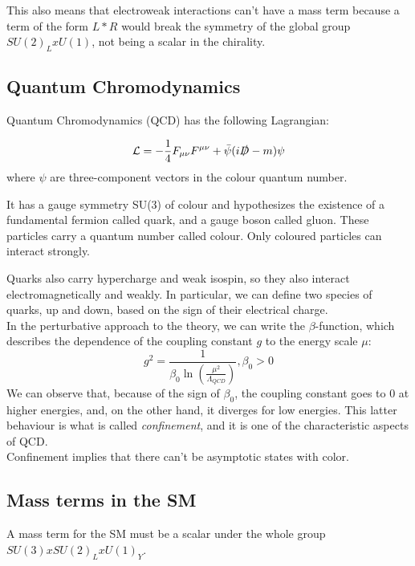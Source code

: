 This also means that electroweak interactions can't have a mass term because a term of the form $L * R$ would break the symmetry of the global group $SU(2)_L x U(1)$, not being a scalar in the chirality.

\subsection{Quantum Chromodynamics}

Quantum Chromodynamics (QCD) has the following Lagrangian:

\begin{equation}
    \mathcal{L} = -\frac{1}{4}F_{\mu \nu}F^{\mu \nu} + \bar{\psi}(i\slashed{D} - m)\psi %
\end{equation}
where $\psi$ are three-component vectors in the colour quantum number.


It has a gauge symmetry SU(3) of colour and hypothesizes the existence of a fundamental fermion called quark, and a gauge boson called gluon.
These particles carry a quantum number called colour. Only coloured particles can interact strongly.

Quarks also carry hypercharge and weak isospin, so they also interact electromagnetically and weakly. In particular, we can define two species of quarks, up and down, based on the sign of their electrical charge.\\

In the perturbative approach to the theory, we can write the $\beta$-function, which describes the dependence of the coupling constant $g$ to the energy scale $\mu$:
\begin{equation}
    g^2 = \dfrac{1}{\beta_0 \ln\left(\frac{\mu^2}{\Lambda_{QCD}}\right)}, \beta_0 > 0
\end{equation}
We can observe that, because of the sign of $\beta_0$, the coupling constant goes to 0 at higher energies, and, on the other hand, it diverges for low energies. This latter behaviour is what is called \emph{confinement}, and it is one of the characteristic aspects of QCD.\\

Confinement implies that there can't be asymptotic states with color.

\subsection{Mass terms in the SM}
A mass term for the SM must be a scalar under the whole group $SU(3)x SU(2)_Lx U(1)_Y$.


